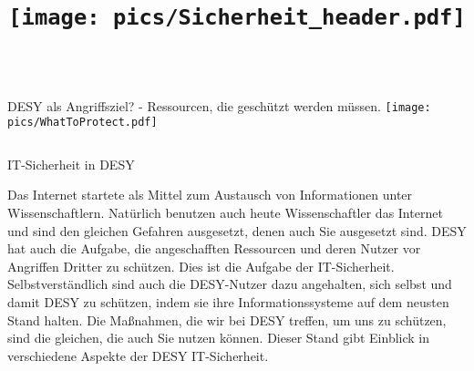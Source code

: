 \documentclass[final]{beamer}
\title{\texttt{[image: pics/Sicherheit\_header.pdf]}} %
\newlength{\twocolwid}
\begin{document}

\setlength{\belowcaptionskip}{2ex} %
\setlength\belowdisplayshortskip{2ex} %

\begin{frame}[t] %

\begin{columns}[b]

\begin{column}{0.95\textwidth}

\begin{alertblock}{\large{DESY als Angriffsziel? - Ressourcen, die geschützt werden müssen.}}
\texttt{[image: pics/WhatToProtect.pdf]}
\end{alertblock}
\end{column}
\end{columns}

\begin{columns}[t] %

\begin{column}{0.95\textwidth} %


\begin{block}{IT-Sicherheit in DESY}

Das Internet startete als Mittel zum Austausch von Informationen
unter Wissenschaftlern. Natürlich benutzen auch heute Wissenschaftler das Internet und sind den gleichen
Gefahren ausgesetzt, denen auch Sie ausgesetzt sind. DESY hat auch die Aufgabe, die angeschafften
Ressourcen und deren Nutzer vor Angriffen Dritter zu schützen. Dies ist die Aufgabe der IT-Sicherheit. 
Selbstverständlich sind auch die DESY-Nutzer dazu angehalten, sich selbst und damit DESY zu schützen, indem sie ihre Informationssysteme auf dem neusten Stand halten. Die Ma{\ss}nahmen, die wir bei DESY treffen, um uns zu schützen, sind die gleichen, die auch Sie nutzen können. Dieser Stand gibt Einblick in verschiedene Aspekte der DESY IT-Sicherheit.


\end{block}
\end{column}
\end{columns}
\end{frame}
\end{document}

